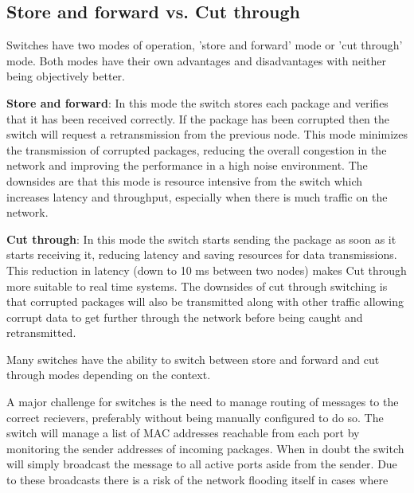 \subsection{Store and forward vs. Cut through}

Switches have two modes of operation, 'store and forward' mode or 'cut through' mode. Both modes have their own advantages and disadvantages with neither being objectively better. 

\noindent \textbf{Store and forward}: In this mode the switch stores each package and verifies that it has been received correctly. If the package has been corrupted then the switch will request a retransmission from the previous node. This mode minimizes the transmission of corrupted packages, reducing the overall congestion in the network and improving the performance in a high noise environment. The downsides are that this mode is resource intensive from the switch which increases latency and throughput, especially when there is much traffic on the network.

\noindent \textbf{Cut through}: In this mode the switch starts sending the package as soon as it starts receiving it, reducing latency and saving resources for data transmissions. This reduction in latency (down to 10 ms between two nodes) makes Cut through more suitable to real time systems. The downsides of cut through switching is that corrupted packages will also be transmitted along with other traffic allowing corrupt data to get further through the network before being caught and retransmitted. 

\noindent Many switches have the ability to switch between store and forward and cut through modes depending on the context.

\noindent A major challenge for switches is the need to manage routing of messages to the correct recievers, preferably without being manually configured to do so. The switch will manage a list of MAC addresses reachable from each port by monitoring the sender addresses of incoming packages. When in doubt the switch will simply broadcast the message to all active ports aside from the sender. Due to these broadcasts there is a risk of the network flooding itself in cases where 

